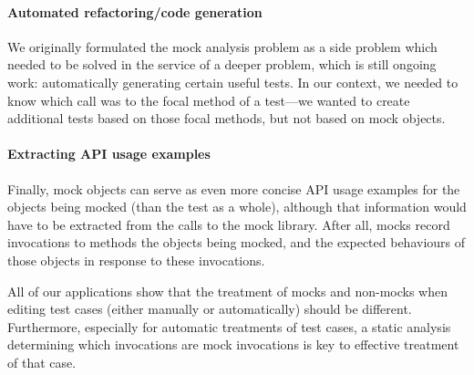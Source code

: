 \paragraph{Automated refactoring/code generation}
We originally formulated the mock analysis problem as a side problem which needed
to be solved in the service of a deeper problem, which is still
ongoing work: automatically generating certain useful tests. In our context,
we needed to know which call was to the focal method of a test---we
wanted to create additional tests based on those focal methods, but
not based on mock objects.

\paragraph{Extracting API usage examples}
Finally, mock objects can serve as even more concise API usage
examples for the objects being mocked (than the test as a whole),
although that information would have to be extracted from the calls to
the mock library. After all, mocks record invocations to methods the objects
being mocked, and the expected behaviours of those objects in response to
these invocations.

All of our applications show that the treatment of mocks and non-mocks
when editing test cases (either manually or automatically) should be different.
Furthermore, especially for automatic treatments of test cases, a static
analysis determining which invocations are mock invocations is key to effective
treatment of that case.

